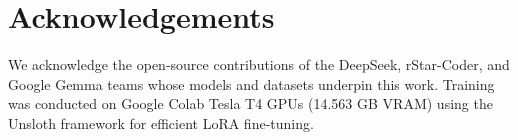 \documentclass[preprint,12pt]{elsarticle}
\begin{document}
\section*{Acknowledgements}

We acknowledge the open-source contributions of the DeepSeek, rStar-Coder, and Google Gemma teams whose models and datasets underpin this work. Training was conducted on Google Colab Tesla T4 GPUs (14.563 GB VRAM) using the Unsloth framework for efficient LoRA fine-tuning.





\end{document}
